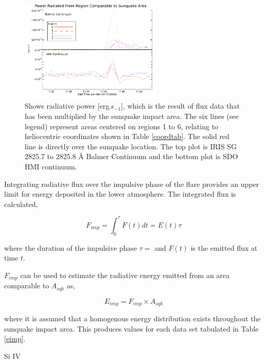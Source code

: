 \begin{figure}[H]
  \begin{center}
  \includegraphics[width=0.6\textwidth]{29-Mar-14-A_sqk-Power-Ladder-Balm-HMI-Only}
  \end{center}
  \caption{Shows radiative power [erg.s$_{-1}$], which is the result of flux data that has been multiplied by the sunquake impact area. The six lines (see legend) represent areas centered on regions 1 to 6, relating to heliocentric coordinates shown in Table \ref{coordtab}. The solid red line is directly over the sunquake location. The top plot is IRIS SG  2825.7 to 2825.8 Å Balmer Continuum and the bottom plot is SDO HMI continuum.}\label{powerladder-balm-hmi-only}
\end{figure}





Integrating radiative flux over the impulsive phase of the flare provides an upper limit for energy deposited in the lower atmosphere. The integrated flux is calculated,

\begin{equation}
F_{imp} = \int_{0}^{\tau} F(t) dt = E(t) \tau
\end{equation}\label{f-imp}
 
where the duration of the impulsive phase $\tau = $ and $F(t)$ is the emitted flux at time $t$. 

$F_{imp}$ can be used to estimate the radiative energy emitted from an area comparable to $A_{sqk}$ as,

\begin{equation}
E_{imp}=F_{imp}{\times}A_{sqk}
\end{equation}\label{e-imp}

where it is assumed that a homogenous energy distribution exists throughout the sunquake impact area. This produces values for each data set tabulated in Table \ref{eimp}. 

Si IV

